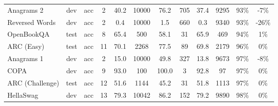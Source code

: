 \begin{table}
{\begin{adjustwidth}{-1.4in}{-1.4in}
\begin{center}
\begin{tabular}{lccccccccccc}
          Anagrams 2 &   dev &      acc &   2 &        40.2 &                     10000 &                            76.2 &                       705 &                            37.4 &                      9295 &                            93\% &                                                -7\% \\
      Reversed Words &   dev &      acc &   2 &         0.4 &                     10000 &                             1.5 &                       660 &                             0.3 &                      9340 &                            93\% &                                               -26\% \\
          OpenBookQA &  test &      acc &   8 &        65.4 &                       500 &                            58.1 &                        31 &                            65.9 &                       469 &                            94\% &                                                 1\% \\
          ARC (Easy) &  test &      acc &  11 &        70.1 &                      2268 &                            77.5 &                        89 &                            69.8 &                      2179 &                            96\% &                                                 0\% \\
          Anagrams 1 &   dev &      acc &   2 &        15.0 &                     10000 &                            49.8 &                       327 &                            13.8 &                      9673 &                            97\% &                                                -8\% \\
                COPA &   dev &      acc &   9 &        93.0 &                       100 &                           100.0 &                         3 &                            92.8 &                        97 &                            97\% &                                                 0\% \\
     ARC (Challenge) &  test &      acc &  12 &        51.6 &                      1144 &                            45.2 &                        31 &                            51.8 &                      1113 &                            97\% &                                                 0\% \\
           HellaSwag &   dev &      acc &  13 &        79.3 &                     10042 &                            86.2 &                       152 &                            79.2 &                      9890 &                            98\% &                                                 0\% \\

\end{tabular}
\end{center}
\end{adjustwidth}}
\end{table}
